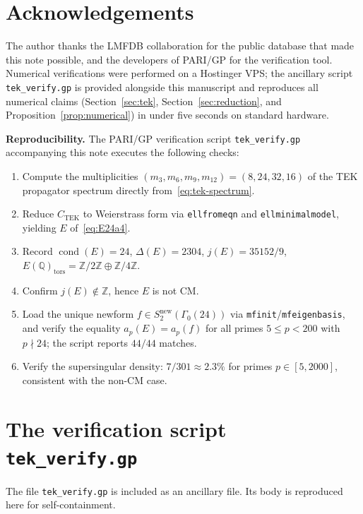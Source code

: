 \documentclass[11pt]{amsart}
\theoremstyle{definition}
\theoremstyle{remark}
\DeclareMathOperator{\cond}{cond}
\newcommand{\Q}{\mathbb{Q}}
\newcommand{\Z}{\mathbb{Z}}
\newcommand{\TEK}{\mathrm{TEK}}
\begin{document}
\section*{Acknowledgements}

The author thanks the LMFDB collaboration \cite{LMFDB} for the
public database that made this note possible, and the developers of
PARI/GP \cite{PARI2024} for the verification tool. Numerical
verifications were performed on a Hostinger VPS;
the ancillary script \texttt{tek\_verify.gp} is provided
alongside this manuscript and reproduces all numerical claims
(Section~\ref{sec:tek}, Section~\ref{sec:reduction}, and
Proposition~\ref{prop:numerical}) in under five seconds on standard
hardware.

\bigskip

\textbf{Reproducibility.} The PARI/GP verification script
\texttt{tek\_verify.gp} accompanying this note executes the
following checks:
\begin{enumerate}
\item Compute the multiplicities
\((m_{3}, m_{6}, m_{9}, m_{12}) = (8, 24, 32, 16)\) of the
TEK propagator spectrum directly from~\eqref{eq:tek-spectrum}.
\item Reduce \(C_{\TEK}\) to Weierstrass form via
\texttt{ellfromeqn} and \texttt{ellminimalmodel}, yielding
\(E\) of~\eqref{eq:E24a4}.
\item Record \(\cond(E) = 24\),
\(\Delta(E) = 2304\),
\(j(E) = 35152/9\),
\(E(\Q)_{\mathrm{tors}} = \Z/2\Z \oplus \Z/4\Z\).
\item Confirm \(j(E) \notin \Z\), hence \(E\) is not CM.
\item Load the unique newform
\(f \in S_{2}^{\mathrm{new}}(\Gamma_{0}(24))\) via
\texttt{mfinit}/\texttt{mfeigenbasis}, and verify the
equality \(a_{p}(E) = a_{p}(f)\) for all primes
\(5 \le p < 200\) with \(p \nmid 24\); the script
reports \(44/44\) matches.
\item Verify the supersingular density: \(7/301 \approx 2.3\%\)
for primes \(p \in [5, 2000]\), consistent with the non-CM
case.
\end{enumerate}

\appendix
\section{The verification script \texttt{tek\_verify.gp}}

The file \texttt{tek\_verify.gp} is included as an ancillary file.
Its body is reproduced here for self-containment.
\end{document}
